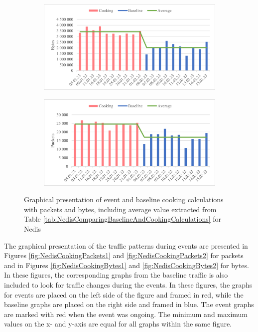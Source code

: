 \begin{figure}[H]
    \centering
    \begin{subfigure}{0.8\textwidth}
        \centering
        \includegraphics[width=1\hsize]{figures/Nedis_Cooking_Calculations_Bytes.png} 
    \end{subfigure}
    \begin{subfigure}{0.8\textwidth}
        \centering
        \includegraphics[width=1\hsize]{figures/Nedis_Cooking_Calculations_Packets.png} 
    \end{subfigure}
    \caption{Graphical presentation of event and baseline cooking calculations with packets and bytes, including average value extracted from Table \ref{tab:NedisComparingBaselineAndCookingCalculations} for Nedis}
    \label{fig:NedisCookingCalculations}
\end{figure}

The graphical presentation of the traffic patterns during events are presented in Figures \ref{fig:NedisCookingPackets1} and \ref{fig:NedisCookingPackets2} for packets and in Figures \ref{fig:NedisCookingBytes1} and \ref{fig:NedisCookingBytes2} for bytes. In these figures, the corresponding graphs from the baseline traffic is also included to look for traffic changes during the events. In these figures, the graphs for events are placed on the left side of the figure and framed in red, while the baseline graphs are placed on the right side and framed in blue. The event graphs are marked with red when the event was ongoing. The minimum and maximum values on the x- and y-axis are equal for all graphs within the same figure. 

